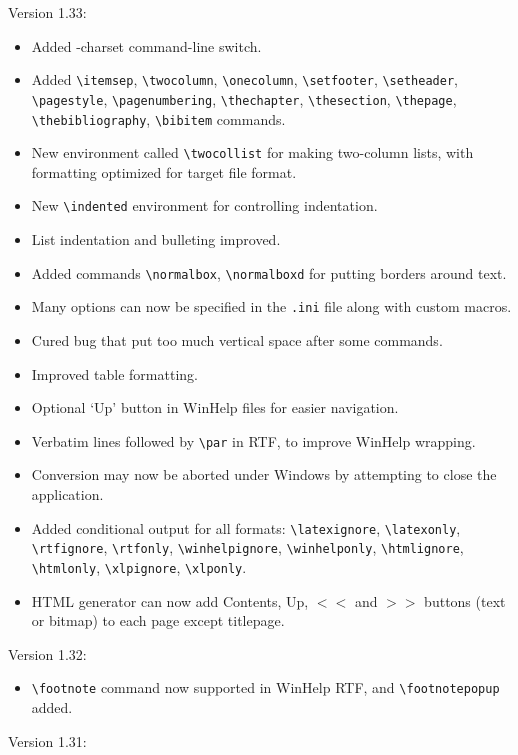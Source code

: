 Version 1.33:

\begin{itemize}
\itemsep=0pt
\item Added -charset command-line switch.
\item Added \verb$\itemsep$, \verb$\twocolumn$, \verb$\onecolumn$, \verb$\setfooter$, \verb$\setheader$, \verb$\pagestyle$,
\verb$\pagenumbering$, \verb$\thechapter$, \verb$\thesection$, \verb$\thepage$, \verb$\thebibliography$, \verb$\bibitem$ commands.
\item New environment called \verb$\twocollist$ for making two-column lists,
with formatting optimized for target file format.
\item New \verb$\indented$ environment for controlling indentation.
\item List indentation and bulleting improved.
\item Added commands \verb$\normalbox$, \verb$\normalboxd$ for putting borders around text.
\item Many options can now be specified in the {\tt .ini} file along with custom macros.
\item Cured bug that put too much vertical space after some commands.
\item Improved table formatting.
\item Optional `Up' button in WinHelp files for easier navigation.
\item Verbatim lines followed by \verb$\par$ in RTF, to improve WinHelp wrapping.
\item Conversion may now be aborted under Windows by attempting to close the application.
\item Added conditional output for all formats: \verb$\latexignore$, \verb$\latexonly$, \verb$\rtfignore$, \verb$\rtfonly$,
\verb$\winhelpignore$, \verb$\winhelponly$, \verb$\htmlignore$, \verb$\htmlonly$, \verb$\xlpignore$, \verb$\xlponly$.
\item HTML generator can now add Contents, Up, $<<$ and $>>$ buttons (text or bitmap) to
each page except titlepage.
\end{itemize}

Version 1.32:

\begin{itemize}
\itemsep=0pt
\item \verb$\footnote$ command now supported in WinHelp RTF, and \verb$\footnotepopup$\rtfsp
added.
\end{itemize}

Version 1.31:

